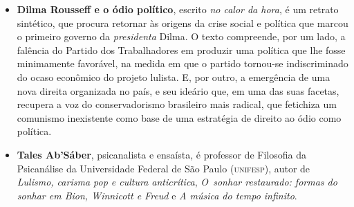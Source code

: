 \begin{itemize}


\item \textbf{Dilma Rousseff e o ódio político}, escrito \emph{no calor da
hora}, é um retrato sintético, que procura retornar às origens da crise social e
política que marcou o primeiro governo da \emph{presidenta} Dilma. O texto
compreende, por um lado, a falência do Partido dos Trabalhadores em produzir uma
política que lhe fosse minimamente favorável, na medida em que o partido
tornou-se indiscriminado do ocaso econômico do projeto lulista. E, por outro, a
emergência de uma nova direita organizada no país, e seu ideário que, em uma das
suas facetas, recupera a voz do conservadorismo brasileiro mais radical, que
fetichiza um comunismo inexistente como base de uma estratégia de direito ao
ódio como política. 
  
\item \textbf{Tales Ab’Sáber}, psicanalista e ensaísta, é professor de Filosofia da Psicanálise da Universidade Federal 
de São Paulo (\textsc{unifesp}), autor de 
\emph{Lulismo, carisma pop e cultura anticrítica},
\textit{O~sonhar
restaurado: formas do sonhar em Bion, Winnicott e Freud} e
\textit{A música do tempo infinito}. 

\end{itemize}

